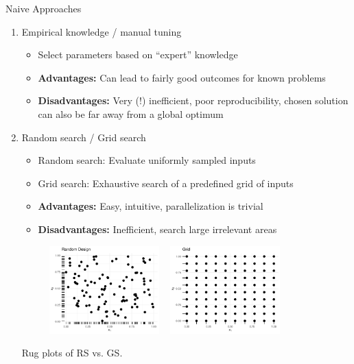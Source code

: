 \documentclass[11pt,compress,t,notes=noshow, xcolor=table]{beamer}
\begin{document}
\begin{vbframe}{Naive Approaches}
\begin{enumerate}
\item Empirical knowledge / manual tuning
\begin{itemize}
\item Select parameters based on \enquote{expert} knowledge 
\item \textbf{Advantages:} Can lead to fairly good outcomes for known problems
\item \textbf{Disadvantages:} Very (!) inefficient, poor reproducibility, chosen solution can also be far away from a global optimum
\end{itemize}

\framebreak 
\item Random search / Grid search
\begin{itemize}
\item Random search: Evaluate uniformly sampled inputs 
\item Grid search: Exhaustive search of a predefined grid of inputs
\item \textbf{Advantages: } Easy, intuitive, parallelization is trivial
\item \textbf{Disadvantages: } Inefficient, search large irrelevant areas
\end{itemize}
\vfill
\begin{center}
\begin{figure}
\includegraphics[width=0.4\textwidth]{figure_man/black_box_0.png} ~ \includegraphics[width=0.4\textwidth]{figure_man/black_box_1.png}
\end{figure}
\begin{footnotesize}
Rug plots of RS vs. GS.
\end{footnotesize}
\end{center}



\end{enumerate}
\end{vbframe}
\end{document}
